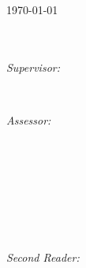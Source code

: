 \begin{titlepage}

{\Large \today}\\[1cm]

\\
\\[1cm]

\begin{minipage}[t]{0.4\textwidth}
\begin{flushleft} \large
\emph{Supervisor:} \\
\end{flushleft}
\end{minipage}
~
\begin{minipage}[t]{0.4\textwidth}
\begin{flushright} \large
\emph{Assessor:} \\
\\
\end{flushright}
\end{minipage}\\[2cm]
~
\begin{minipage}[t]{0.4\textwidth}
\begin{flushleft} \large
\emph{} \\
\red{}
\end{flushleft}
\end{minipage}
~
\begin{minipage}[t]{0.4\textwidth}
\begin{flushright} \large
\emph{Second Reader:} \\
\\
\end{flushright}
\end{minipage}\\[2cm]
    

\framebox{\rule{0pt}{2.5cm}\rule{2.5cm}{0pt}}\\[0.5cm]
\textsc{\large {}}\\[1.0cm] %
 

\vfill %

\end{titlepage}

